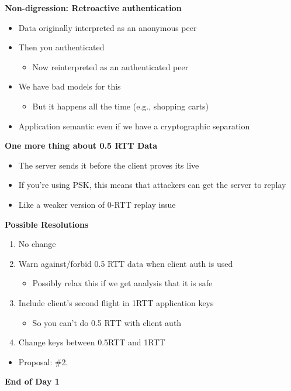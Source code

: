 \documentclass[helvetica]{seminar}
\newcommand{\heading}[1]{%
  \begin{center} 
    \large\bf 
    #1 
  \end{center} 
  \vspace{.4 in}}
\begin{document}
\begin{slide}
\heading{Non-digression: Retroactive authentication}

\begin{itemize}
\item Data originally interpreted as an anonymous peer
\item Then you authenticated
  \begin{itemize}
  \item Now reinterpreted as an authenticated peer
  \end{itemize}
\item We have bad models for this
  \begin{itemize}
  \item But it happens all the time (e.g., shopping carts)
  \end{itemize}

\item Application semantic even if we have a cryptographic separation
\end{itemize}
\end{slide}


\begin{slide}
\heading{One more thing about 0.5 RTT Data}

\begin{itemize}
\item The server sends it before the client proves its live
\item If you're using PSK, this means that attackers can get the server to replay
\item Like a weaker version of 0-RTT replay issue
\end{itemize}

\end{slide}


\begin{slide}
\heading{Possible Resolutions}

\begin{enumerate}
\item No change
\item Warn against/forbid 0.5 RTT data when client auth is used 
  \begin{itemize}
  \item Possibly relax this if we get analysis that it is safe
  \end{itemize}
\item Include client's second flight in 1RTT application keys
  \begin{itemize}
  \item So you can't do 0.5 RTT with client auth
  \end{itemize}
\item Change keys between 0.5RTT and 1RTT
\end{enumerate}

\begin{itemize}
\item Proposal: \#2.
\end{itemize}
\end{slide}


\begin{slide}
\heading{End of Day 1}

\end{slide}
\end{document}
